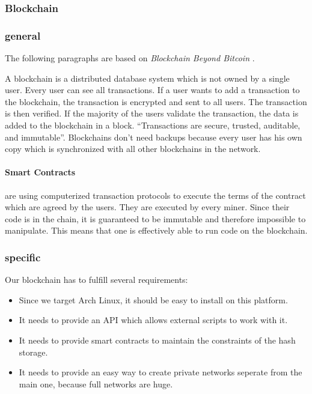 \subsubsection{Blockchain} \label{sec:blockchain}

\subsubsection*{general}
The following paragraphs are based on \emph{Blockchain Beyond Bitcoin} \cite{Underwood}.

A blockchain is a distributed database system which is not owned by a single user. Every user can see all transactions. If a user wants to add a transaction to the blockchain, the transaction is encrypted and sent to all users. The transaction is then verified. If the majority of the users validate the transaction, the data is added to the blockchain in a block. ``Transactions are secure, trusted, auditable, and immutable''. Blockchains don't need backups because every user has his own copy which is synchronized with all other blockchains in the network.

\paragraph*{Smart Contracts} are using computerized transaction protocols to execute the terms of the contract which are agreed by the users. They are executed by every miner. Since their code is in the chain, it is guaranteed to be immutable and therefore impossible to manipulate. This means that one is effectively able to run code on the blockchain.

\subsubsection*{specific}
Our blockchain has to fulfill several requirements:
\begin{itemize}
	\item Since we target Arch Linux, it should be easy to install on this platform.
	\item It needs to provide an API which allows external scripts to work with it.
	\item It needs to provide smart contracts to maintain the constraints of the hash storage.
	\item It needs to provide an easy way to create private networks seperate from the main one, because full networks are huge.
\end{itemize}

